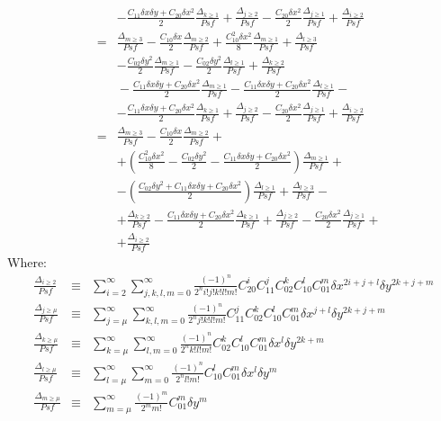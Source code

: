 \documentclass{article}
\begin{document}
\begin{eqnarray}
	&&-\frac{C_{11}\delta x\delta y+C_{20}\delta x^2}{2}
	\frac{\Delta_{k\ge1}}{Psf}+\frac{\Delta_{j\ge2}}{Psf}-
	\frac{C_{20}\delta x^2}{2}\frac{\Delta_{j\ge1}}{Psf} 
	+\frac{\Delta_{i\ge2}}{Psf}\\
%
	&=&\frac{\Delta_{m\ge3}}{Psf}-
	\frac{C_{10}\delta x}{2}\frac{\Delta_{m\ge2}}{Psf}+
	\frac{C_{10}^2\delta x^2}{8}\frac{\Delta_{m\ge1}}{Psf}+
	\frac{\Delta_{l\ge3}}{Psf}
	\nonumber\\
	&&-\frac{C_{02}\delta y^2}{2}\frac{\Delta_{m\ge1}}{Psf}
	-\frac{C_{02}\delta y^2}{2}\frac{\Delta_{l\ge1}}{Psf}+
	\frac{\Delta_{k\ge2}}{Psf}
	\nonumber\\
	&&{}-\frac{C_{11}\delta x\delta y+C_{20}\delta x^2}{2}
	\frac{\Delta_{m\ge1}}{Psf}
	-\frac{C_{11}\delta x\delta y+C_{20}\delta x^2}{2}
	\frac{\Delta_{l\ge1}}{Psf}
	-\nonumber\\
	&&-\frac{C_{11}\delta x\delta y+C_{20}\delta x^2}{2}
	\frac{\Delta_{k\ge1}}{Psf}+\frac{\Delta_{j\ge2}}{Psf}-
	\frac{C_{20}\delta x^2}{2}\frac{\Delta_{j\ge1}}{Psf} 
	+\frac{\Delta_{i\ge2}}{Psf}\\
%
	&=&\frac{\Delta_{m\ge3}}{Psf}-
	\frac{C_{10}\delta x}{2}\frac{\Delta_{m\ge2}}{Psf}+
	\nonumber\\
	&&+\left(\frac{C_{10}^2\delta x^2}{8}
		-\frac{C_{02}\delta y^2}{2}
		-\frac{C_{11}\delta x\delta y+C_{20}\delta x^2}{2}
	\right)\frac{\Delta_{m\ge1}}{Psf}+
	\nonumber\\
	&&-\left(\frac{C_{02}\delta y^2
		+C_{11}\delta x\delta y+C_{20}\delta x^2}{2}
	\right)\frac{\Delta_{l\ge1}}{Psf}
	+\frac{\Delta_{l\ge3}}{Psf}-
	\nonumber\\
	&&+\frac{\Delta_{k\ge2}}{Psf}
	-\frac{C_{11}\delta x\delta y+C_{20}\delta x^2}{2}
	\frac{\Delta_{k\ge1}}{Psf}+\frac{\Delta_{j\ge2}}{Psf}-
	\frac{C_{20}\delta x^2}{2}\frac{\Delta_{j\ge1}}{Psf}+
	\nonumber\\
	&&+\frac{\Delta_{i\ge2}}{Psf}
\end{eqnarray}
Where:
\begin{eqnarray}
	\frac{\Delta_{i\ge2}}{Psf}&\equiv&
	\sum_{i=2}^{\infty}\sum_{j,k,l,m=0}^{\infty} \frac{(-1)^n}{2^n i!j!k!l!m!}
	C_{20}^i C_{11}^j C_{02}^k C_{10}^l C_{01}^m 
	\delta x^{2i+j+l} \delta y^{2k+j+m}\label{eq: Delta_i}\\
%
	\frac{\Delta_{j\ge\mu}}{Psf}&\equiv&
	\sum_{j=\mu}^{\infty}\sum_{k,l,m=0}^{\infty} \frac{(-1)^n}{2^n j!k!l!m!}
	C_{11}^j C_{02}^k C_{10}^l C_{01}^m 
	\delta x^{j+l} \delta y^{2k+j+m} \label{eq: Delta_j} \\
%
	\frac{\Delta_{k\ge\mu}}{Psf}&\equiv&
	\sum_{k=\mu}^{\infty}\sum_{l,m=0}^{\infty} \frac{(-1)^n}{2^n k!l!m!}
	C_{02}^k C_{10}^l C_{01}^m 
	\delta x^{l} \delta y^{2k+m} \label{eq: Delta_k} \\
%
	\frac{\Delta_{l\ge\mu}}{Psf}&\equiv&
	\sum_{l=\mu}^{\infty}\sum_{m=0}^{\infty} \frac{(-1)^n}{2^n l!m!}
	C_{10}^l C_{01}^m \delta x^l \delta y^m \label{eq: Delta_l} \\
%
	\frac{\Delta_{m\ge\mu}}{Psf}&\equiv&
	\sum_{m=\mu}^{\infty} \frac{(-1)^m}{2^m m!} C_{01}^m \delta y^m
	\label{eq: Delta_l} \\
\end{eqnarray}
\end{document}
